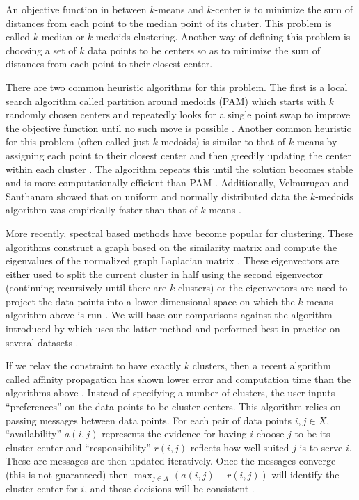 \documentclass{article}
\begin{document}
An objective function in between $k$-means and $k$-center is to minimize the sum of distances from each point to the median point of its cluster. This problem is called $k$-median or $k$-medoids clustering. Another way of defining this problem is choosing a set of $k$ data points to be centers so as to minimize the sum of distances from each point to their closest center. 

There are two common heuristic algorithms for this problem. The first is a local search algorithm called partition around medoids (PAM) which starts with $k$ randomly chosen centers and repeatedly looks for a single point swap to improve the objective function until no such move is possible \cite{ESL}. 
Another common heuristic for this problem (often called just $k$-medoids) is similar to that of $k$-means by assigning each point to their closest center and then greedily updating the center within each cluster \cite{Park}. The algorithm repeats this until the solution becomes stable and is more computationally efficient than PAM \cite{Park}. Additionally, Velmurugan and Santhanam showed that on uniform and normally distributed data the $k$-medoids algorithm was empirically faster than that of $k$-means \cite{Velmurugan}. 

More recently, spectral based methods have become popular for clustering. These algorithms construct a graph based on the similarity matrix and compute the eigenvalues of the normalized graph Laplacian matrix \cite{Luxburg}. These eigenvectors are either used to split the current cluster in half using the second eigenvector (continuing recursively until there are $k$ clusters) or the eigenvectors are used to project the data points into a lower dimensional space on which the $k$-means algorithm above is run \cite{Verma}. We will base our comparisons against the algorithm introduced by \cite{Meila} which uses the latter method and performed best in practice on several datasets \cite{Verma}.

If we relax the constraint to have exactly $k$ clusters, then a recent algorithm called affinity propagation has shown lower error and computation time than the algorithms above \cite{Frey}. Instead of specifying a number of clusters, the user inputs ``preferences'' on the data points to be cluster centers. This algorithm relies on passing messages between data points. For each pair of data points $i, j \in X$, ``availability'' $a(i,j)$ represents the evidence for having $i$ choose $j$ to be its cluster center and ``responsibility'' $r(i,j)$ reflects how well-suited $j$ is to serve $i$. These are messages are then updated iteratively. Once the messages converge (this is not guaranteed) then $\max_{j \in X} (a(i,j) + r(i,j))$ will identify the cluster center for $i$, and these decisions will be consistent \cite{Frey}.
\end{document}
